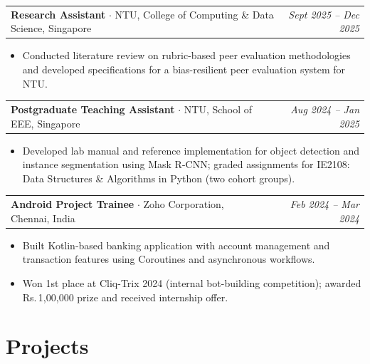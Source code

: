 \documentclass[10pt, a4paper]{article}
\makeatletter
\newcommand{\jobentry}[3]{%
    \noindent
    \begin{tabularx}{\textwidth}{@{}X r@{}}
        \textbf{#1} $\cdot$ #2 & \textit{#3}
    \end{tabularx}%
    \vspace{1pt}%
}
\newcommand{\entryspace}{\vspace{6pt}}
\newcommand{\sectionspace}{\vspace{2pt}}
\makeatother
\begin{document}
\entryspace

\jobentry{Research Assistant}{NTU, College of Computing \& Data Science, Singapore}{Sept 2025 -- Dec 2025}
\begin{itemize}
    \item Conducted literature review on rubric-based peer evaluation methodologies and developed specifications for a bias-resilient peer evaluation system for NTU.
\end{itemize}

\entryspace

\jobentry{Postgraduate Teaching Assistant}{NTU, School of EEE, Singapore}{Aug 2024 -- Jan 2025}
\begin{itemize}
    \item Developed lab manual and reference implementation for object detection and instance segmentation using Mask R-CNN; graded assignments for IE2108: Data Structures \& Algorithms in Python (two cohort groups).
\end{itemize}

\entryspace

\jobentry{Android Project Trainee}{Zoho Corporation, Chennai, India}{Feb 2024 -- Mar 2024}
\begin{itemize}
    \item Built Kotlin-based banking application with account management and transaction features using Coroutines and asynchronous workflows.
    \item Won 1st place at Cliq-Trix 2024 (internal bot-building competition); awarded Rs.\,1,00,000 prize and received internship offer.
\end{itemize}

\entryspace

\section{Projects}
\sectionspace
\end{document}
